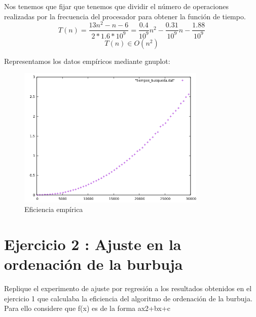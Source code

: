 \documentclass{article}
\begin{document}
	Nos tenemos que fijar que tenemos que dividir el número de operaciones realizadas por la frecuencia del procesador para obtener la función de tiempo.
		\begin{equation}
			T(n) = \frac{13n^2 -n -6}{2*1.6*10^9} = \frac{0.4}{10^9}n^2 - \frac{0.31}{10^9}n - \frac{1.88}{10^9} 
		\end{equation}
		\begin{equation}
						T(n) \in O(n^2)
		\end{equation}

	Representamos los datos empíricos mediante gnuplot:
	\begin{figure}[H]
  		\caption{Eficiencia empírica}
  		\centering
  		\includegraphics[width=0.8\textwidth]{ejer1/grafica.png}
	\end{figure}


\clearpage
\section{Ejercicio 2 : Ajuste en la ordenación de la burbuja}
Replique el experimento de ajuste por regresión a los resultados obtenidos en el ejercicio 1 que calculaba la eficiencia del algoritmo de ordenación de la burbuja. Para ello considere que f(x) es de la forma ax2+bx+c
\vspace{10mm}
\end{document}
